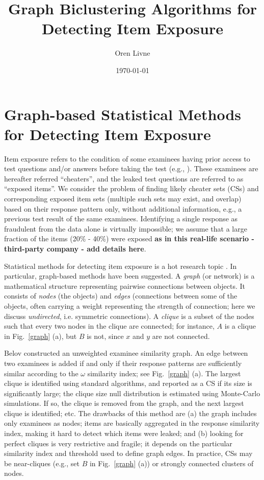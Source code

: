 \documentclass{article}
\title{Graph Biclustering Algorithms for Detecting Item Exposure}
\author[1]{Oren Livne}
\affil[1]{Educational Testing Service, 660 Rosedale Road, Attn: MS-12, T-197, Princeton, NJ 08540. Email: olivne@ets.org}
\date{\today}
\begin{document}
\maketitle

\section{Graph-based Statistical Methods for Detecting Item Exposure}
Item exposure refers to the condition of some examinees having prior access to test questions and/or answers before taking the test (e.g., \cite{eckerly}). These examinees are hereafter referred ``cheaters'', and the leaked test questions are referred to as ``exposed items''. We consider the problem of finding likely cheater sets (CSs) and corresponding exposed item sets (multiple such sets may exist, and overlap) based on their response pattern only, without additional information, e.g., a previous test result of the same examinees. Identifying a single response as fraudulent from the data alone is virtually impossible; we assume that a large fraction of the items (20\% - 40\%) were exposed {\bf as in this real-life scenario - third-party company - add details here}.

Statistical methods for detecting item exposure is a hot research topic \cite{test_fraud_book}. In particular, graph-based methods have been suggested. A {\it graph} (or network) is a mathematical structure representing pairwise connections between objects. It consists of {\it nodes} (the objects) and {\it edges} (connections between some of the objects, often carrying a weight representing the strength of connection; here we discuss {\it undirected}, i.e. symmetric connections). A {\it clique} is a subset of the nodes such that every two nodes in the clique are connected; for instance, $A$ is a clique in Fig.~\ref{graph} (a), but $B$ is not, since $x$ and $y$ are not connected.
 
Belov \cite{belov} constructed an unweighted examinee similarity graph. An edge between two examinees is added if and only if their response patterns are sufficiently similar according to the $\omega$ similarity index; see Fig.~\ref{graph} (a). The largest clique is identified using standard algorithms, and reported as a CS if its size is significantly large; the clique size null distribution is estimated using Monte-Carlo simulations. If so, the clique is removed from the graph, and the next largest clique is identified; etc. The drawbacks of this method are (a) the graph includes only examinees as nodes; items are basically aggregated in the response similarity index, making it hard to detect which items were leaked; and (b) looking for perfect cliques is very restrictive and fragile; it depends on the particular similarity index and threshold used to define graph edges. In practice, CSs may be near-cliques (e.g., set $B$ in Fig.~\ref{graph} (a)) or strongly connected clusters of nodes.
\end{document}
